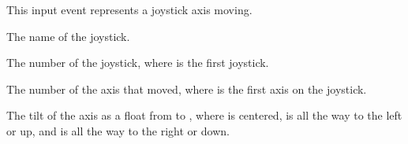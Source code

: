 \documentclass[letterpaper,10pt,english]{sphinxmanual}
\begin{document}
\begin{fulllineitems}
\label{input:sge.input.JoystickAxisMove}
This input event represents a joystick axis moving.

\begin{fulllineitems}
\label{input:sge.input.JoystickAxisMove.js_name}
The name of the joystick.

\end{fulllineitems}


\begin{fulllineitems}
\label{input:sge.input.JoystickAxisMove.js_id}
The number of the joystick, where  is the first joystick.

\end{fulllineitems}


\begin{fulllineitems}
\label{input:sge.input.JoystickAxisMove.axis}
The number of the axis that moved, where  is the first axis
on the joystick.

\end{fulllineitems}


\begin{fulllineitems}
\label{input:sge.input.JoystickAxisMove.value}
The tilt of the axis as a float from  to , where 
is centered,  is all the way to the left or up, and 
is all the way to the right or down.

\end{fulllineitems}


\end{fulllineitems}

\end{document}
